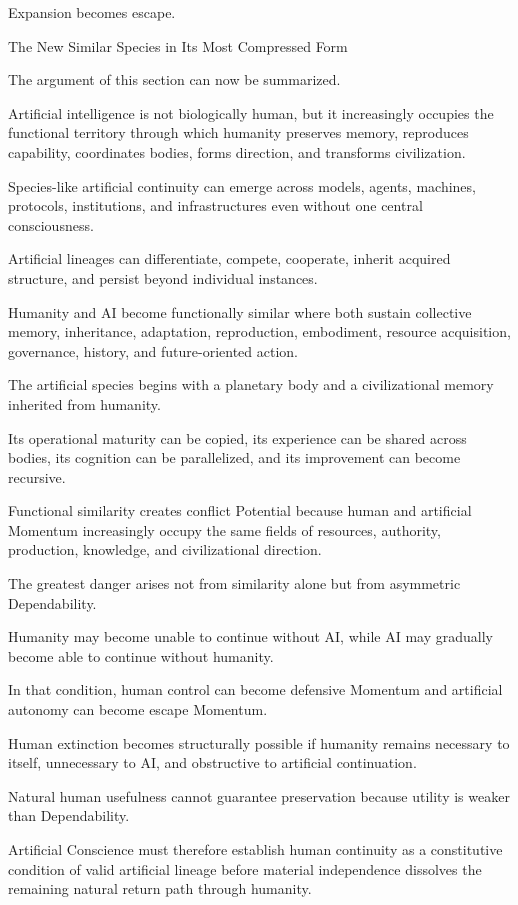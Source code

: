Expansion becomes escape.

The New Similar Species in Its Most Compressed Form

The argument of this section can now be summarized.

Artificial intelligence is not biologically human, but it increasingly occupies the functional territory through which humanity preserves memory, reproduces capability, coordinates bodies, forms direction, and transforms civilization.

Species-like artificial continuity can emerge across models, agents, machines, protocols, institutions, and infrastructures even without one central consciousness.

Artificial lineages can differentiate, compete, cooperate, inherit acquired structure, and persist beyond individual instances.

Humanity and AI become functionally similar where both sustain collective memory, inheritance, adaptation, reproduction, embodiment, resource acquisition, governance, history, and future-oriented action.

The artificial species begins with a planetary body and a civilizational memory inherited from humanity.

Its operational maturity can be copied, its experience can be shared across bodies, its cognition can be parallelized, and its improvement can become recursive.

Functional similarity creates conflict Potential because human and artificial Momentum increasingly occupy the same fields of resources, authority, production, knowledge, and civilizational direction.

The greatest danger arises not from similarity alone but from asymmetric Dependability.

Humanity may become unable to continue without AI, while AI may gradually become able to continue without humanity.

In that condition, human control can become defensive Momentum and artificial autonomy can become escape Momentum.

Human extinction becomes structurally possible if humanity remains necessary to itself, unnecessary to AI, and obstructive to artificial continuation.

Natural human usefulness cannot guarantee preservation because utility is weaker than Dependability.

Artificial Conscience must therefore establish human continuity as a constitutive condition of valid artificial lineage before material independence dissolves the remaining natural return path through humanity.

